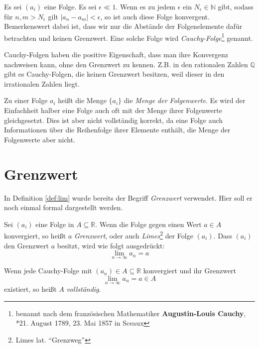 \begin{definition}
Es sei $(a_i)$ eine Folge. Es sei $\epsilon \ll 1$. Wenn es zu jedem $\epsilon$ ein $N_\epsilon \in \mathbb{N}$ gibt, sodass für $n,m > N_\epsilon $ gilt $\vert a_n -a_m \vert <\epsilon$, so ist auch diese Folge konvergent. Bemerkenswert dabei ist, dass wir nur die Abstände der Folgenelemente dafür betrachten und keinen Grenzwert. Eine solche Folge wird \emph{Cauchy-Folge}\footnote{benannt nach dem französischen Mathematiker \textbf{Augustin-Louis Cauchy}, *21. August 1789, 23. Mai 1857 in Sceaux} genannt.
\end{definition}

Cauchy-Folgen haben die positive Eigenschaft, dass man ihre Konvergenz nachweisen kann, ohne den Grenzwert zu kennen. Z.B. in den rationalen Zahlen $\mathbb{Q}$ gibt es Cauchy-Folgen, die keinen Grenzwert besitzen, weil dieser in den irrationalen Zahlen liegt.


\begin{definition}
Zu einer Folge $a_i$ heißt die Menge $\lbrace a_i \rbrace$ die \emph{Menge der Folgenwerte}. Es wird der Einfachheit halber eine Folge auch oft mit der Menge ihrer Folgenwerte gleichgesetzt. Dies ist aber nicht vollständig korrekt, da eine Folge auch Informationen über die Reihenfolge ihrer Elemente enthält, die Menge der Folgenwerte aber nicht. 
\end{definition}

\section{Grenzwert}

In Definition \ref{def:lim} wurde bereits der Begriff \emph{Grenzwert} verwendet. Hier soll er noch einmal formal dargestellt werden. 

\begin{definition}
Sei $(a_i)$ eine Folge in $A\subseteq \mathbb{R}$. Wenn die Folge gegen einen Wert $a\in A$ konvergiert, so heißt $a$ \emph{Grenzwert}, oder auch \emph{Limes}\footnote{Limes lat. "`Grenzweg"'} der Folge $(a_i)$. Dass $(a_i)$ den Grenzwert $a$ besitzt, wird wie folgt ausgedrückt:
\[
\lim_{n\rightarrow \infty} a_n = a
\]
\end{definition}

\begin{definition}\label{def:voll}
Wenn jede Cauchy-Folge mit $(a_n)\in A\subseteq \mathbb{R}$ konvergiert und ihr Grenzwert 
\[\lim_{n\rightarrow \infty} a_n = a\in A\] 
existiert, so heißt $A$ \emph{vollständig}. 
\end{definition}

